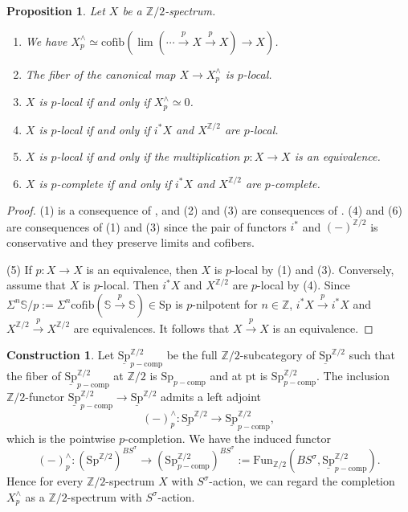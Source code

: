 \documentclass[10pt]{amsart}
\newtheorem{prop}[thm]{Proposition}
\theoremstyle{definition}
\newtheorem{const}[thm]{Construction}
\numberwithin{equation}{section}
\newcommand{\Sphere}{\mathbb{S}}
\newcommand{\Z}{\mathbb{Z}}
\newcommand{\ul}{\underline}
\newcommand{\pt}{\mathrm{pt}}
\newcommand{\Fun}{\mathrm{Fun}}
\newcommand{\Sp}{\mathrm{Sp}}
\newcommand{\cofib}{\mathrm{cofib}}
\newcommand{\comp}{\mathrm{comp}}
\begin{document}
{\begin{prop}
\label{comp.2}
Let $X$ be a $\Z/2$-spectrum.
\begin{enumerate}
\item[\textup{(1)}]
We have
$X_p^\wedge\simeq \cofib(\lim (\cdots \xrightarrow{p} X\xrightarrow{p} X)\to X)$.
\item[\textup{(2)}]
The fiber of the canonical map $X\to X_p^\wedge$ is $p$-local.
\item[\textup{(3)}] $X$ is $p$-local if and only if $X_p^\wedge \simeq 0$.
\item[\textup{(4)}] $X$ is $p$-local if and only if $i^*X$ and $X^{\Z/2}$ are $p$-local.
\item[\textup{(5)}] $X$ is $p$-local if and only if the multiplication $p\colon X\to X$ is an equivalence.
\item[\textup{(6)}] $X$ is $p$-complete if and only if $i^*X$ and $X^{\Z/2}$ are $p$-complete.
\end{enumerate}
\end{prop}
\begin{proof}
(1) is a consequence of \cite[Proposition 7.3.2.1]{SAG},
and (2) and (3) are consequences of \cite[Proposition 7.3.1.4]{SAG}. (4) and (6) are consequences of (1) and (3) since the pair of functors $i^*$ and $(-)^{\Z/2}$ is conservative and they preserve limits and cofibers.

(5) If $p\colon X\to X$ is an equivalence,
then $X$ is $p$-local by (1) and (3).
Conversely, assume that $X$ is $p$-local.
Then $i^*X$ and $X^{\Z/2}$ are $p$-local by (4).
Since $\Sigma^n\Sphere/p:=\Sigma^n\cofib(\Sphere\xrightarrow{p}\Sphere)\in \Sp$ is $p$-nilpotent for $n\in \Z$,
$i^*X\xrightarrow{p} i^*X$ and $X^{\Z/2}\xrightarrow{p} X^{\Z/2}$ are equivalences.
It follows that $X\xrightarrow{p} X$ is an equivalence.
\end{proof}


\begin{const}
\label{comp.7}
Let $\ul{\Sp}_{p-\comp}^{\Z/2}$ be the full $\Z/2$-subcategory of $\ul{\Sp}^{\Z/2}$ such that the fiber of $\ul{\Sp}_{p-\comp}^{\Z/2}$ at $\Z/2$ is $\Sp_{p-\comp}$ and at $\pt$ is $\Sp_{p-\comp}^{\Z/2}$.
The inclusion $\Z/2$-functor $\ul{\Sp}_{p-\comp}^{\Z/2}\to \ul{\Sp}^{\Z/2}$ admits a left adjoint
\[
(-)_p^\wedge
\colon
\ul{\Sp}^{\Z/2}
\to
\ul{\Sp}_{p-\comp}^{\Z/2},
\]
which is the pointwise $p$-completion.
We have the induced functor
\[
(-)_p^\wedge
\colon
(\Sp^{\Z/2})^{B S^\sigma}
\to
(\Sp_{p-\comp}^{\Z/2})^{B S^\sigma}
:=
\Fun_{\Z/2}(B S^\sigma,\ul{\Sp}_{p-\comp}^{\Z/2}).
\]
Hence for every $\Z/2$-spectrum $X$ with $S^\sigma$-action,
we can regard the completion $X_p^\wedge$ as a $\Z/2$-spectrum with $S^\sigma$-action.
\end{const}



}
\end{document}
